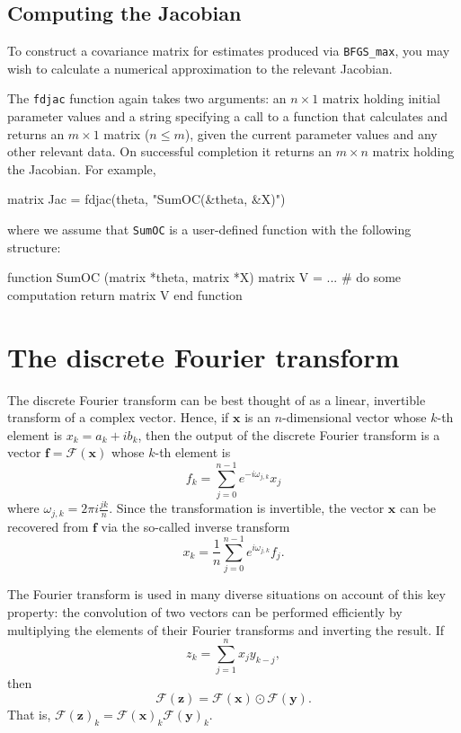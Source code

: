 \subsection{Computing the Jacobian}

To construct a covariance matrix for estimates produced via
\verb+BFGS_max+, you may wish to calculate a numerical approximation
to the relevant Jacobian.

The \texttt{fdjac} function again takes two arguments: an $n \times 1$
matrix holding initial parameter values and a string specifying a call
to a function that calculates and returns an $m \times 1$ matrix ($n
\leq m$), given the current parameter values and any other relevant
data.  On successful completion it returns an $m \times n$ matrix
holding the Jacobian.  For example,
%
\begin{code}
matrix Jac = fdjac(theta, "SumOC(&theta, &X)")
\end{code}
where we assume that \texttt{SumOC} is a user-defined function with
the following structure:
%
\begin{code}
function SumOC (matrix *theta, matrix *X)
  matrix V = ...  # do some computation
  return matrix V
end function
\end{code}

\section{The discrete Fourier transform}
\label{sec:genr-fft}

The discrete Fourier transform can be best thought of as a linear,
invertible transform of a complex vector. Hence, if $\mathbf{x}$ is an
$n$-dimensional vector whose $k$-th element is $x_k = a_k + i b_k$,
then the output of the discrete Fourier transform is a vector
$\mathbf{f} = \mathcal{F}(\mathbf{x})$ whose $k$-th element is
\[
  f_k = \sum_{j=0}^{n-1} e^{-i \omega_{j,k} } x_j 
\]
where $\omega_{j,k} = 2 \pi i \frac{j k}{n}$. Since the transformation
is invertible, the vector $\mathbf{x}$ can be recovered from
$\mathbf{f}$ via the so-called inverse transform
\[
  x_k = \frac{1}{n} \sum_{j=0}^{n-1} e^{i \omega_{j,k} } f_j .
\]

The Fourier transform is used in many diverse situations
on account of this key property: the convolution of two vectors can be
performed efficiently by multiplying the elements of their Fourier
transforms and inverting the result.  If
\[
  z_k = \sum_{j=1}^n x_j y_{k-j} ,
\]
then
\[
  \mathcal{F}(\mathbf{z}) = \mathcal{F}(\mathbf{x}) \odot
  \mathcal{F}(\mathbf{y}) .
\]
That is, $\mathcal{F}(\mathbf{z})_k = \mathcal{F}(\mathbf{x})_k
\mathcal{F}(\mathbf{y})_k$.

